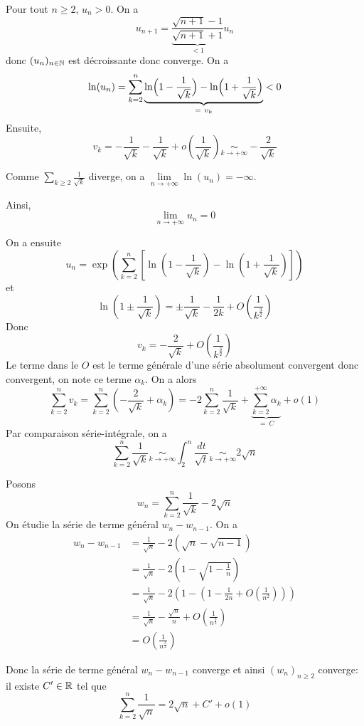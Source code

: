 \begin{solution}
	Pour tout $n\geqslant2$, $u_{n}>0$. On a 
	$$u_{n+1}=\underbrace{\frac{\sqrt{n+1}-1}{\sqrt{n+1}+1}}_{<1}u_{n}$$
	donc $(u_{n})_{n\in\mathbb{N}}$ est décroissante donc converge. On a 
	$$\ln(u_{n})=\sum_{k=2}^{n}\underbrace{\ln\Bigl(1-\frac{1}{\sqrt{k}}\Bigr)-\ln\Bigl(1+\frac{1}{\sqrt{k}}\Bigr)}_{=~v_{k}}<0$$
	Ensuite, 
	$$v_{k}=-\frac{1}{\sqrt{k}}-\frac{1}{\sqrt{k}}+o\left(\frac{1}{\sqrt{k}}\right)\underset{k\to+\infty}{\sim}-\frac{2}{\sqrt{k}}$$

	Comme $\sum_{k\geqslant2}\frac{1}{\sqrt{k}}$ diverge, on a $\lim\limits_{n\to+\infty}\ln(u_{n})=-\infty$.

	Ainsi, 
	$$\boxed{\lim\limits_{n\to+\infty}u_{n}=0}$$

	On a ensuite 
	$$u_{n}=\exp\left(\sum_{k=2}^{n}\left[\ln\left(1-\frac{1}{\sqrt{k}}\right)-\ln\left(1+\frac{1}{\sqrt{k}}\right)\right]\right)$$
	et 
	$$\ln\left(1\pm\frac{1}{\sqrt{k}}\right)=\pm\frac{1}{\sqrt{k}}-\frac{1}{2k}+O\left(\frac{1}{k^{\frac{3}{2}}}\right)$$
	Donc 
	$$v_{k}=-\frac{2}{\sqrt{k}}+O\left(\frac{1}{k^{\frac{3}{2}}}\right)$$
	Le terme dans le $O$ est le terme générale d'une série absolument convergent donc convergent, on note ce terme $\alpha_{k}$. On a alors 
	$$\sum_{k=2}^{n}v_{k}=\sum_{k=2}^{n}\left(-\frac{2}{\sqrt{k}}+\alpha_{k}\right)=-2\sum_{k=2}^{n}\frac{1}{\sqrt{k}}+\underbrace{\sum_{k=2}^{+\infty}\alpha_{k}}_{=~C}+o\left(1\right)$$
	Par comparaison série-intégrale, on a 
	$$\sum_{k=2}^{n}\frac{1}{\sqrt{k}}\underset{k\to+\infty}{\sim}\int_{2}^{n}\frac{dt}{\sqrt{t}}\underset{k\to+\infty}{\sim}2\sqrt{n}$$

	Posons 
	$$w_{n}=\sum_{k=2}^{n}\frac{1}{\sqrt{k}}-2\sqrt{n}$$
	On étudie la série de terme général $w_{n}-w_{n-1}$. On a 
	\begin{align*}
		w_{n}-w_{n-1}
		&=\frac{1}{\sqrt{n}}-2\left(\sqrt{n}-\sqrt{n-1}\right)\\
		&=\frac{1}{\sqrt{n}}-2\left(1-\sqrt{1-\frac{1}{n}}\right)\\
		&=\frac{1}{\sqrt{n}}-2\left(1-\left(1-\frac{1}{2n}+O\left(\frac{1}{n^{2}}\right)\right)\right)\\
		&=\frac{1}{\sqrt{n}}-\frac{\sqrt{n}}{n}+O\left(\frac{1}{n^{\frac{3}{2}}}\right)\\
		&=O\left(\frac{1}{n^{\frac{3}{2}}}\right)
	\end{align*}

	Donc la série de terme général $w_{n}-w_{n-1}$ converge et ainsi $(w_{n})_{n\geqslant2}$ converge: il existe $C'\in\mathbb{R}$ tel que 
	$$\sum_{k=2}^{n}\frac{1}{\sqrt{n}}=2\sqrt{n}+C'+o\left(1\right)$$


\end{solution}
